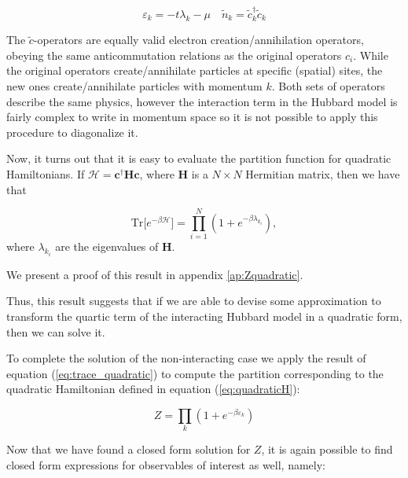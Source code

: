 \begin{equation}
\varepsilon_k = -t \lambda_k - \mu \quad \tilde{n}_k = \tilde{c}_k^\dagger \tilde{c}_k
\end{equation}

The $\tilde{c}$-operators are equally valid electron creation/annihilation operators, obeying the same anticommutation relations as the original operators $c_i$. While the original operators create/annihilate particles at specific (spatial) sites, the new ones create/annihilate particles with momentum $k$. Both sets of operators describe the same physics, however the interaction term in the Hubbard model is fairly complex to write in momentum space so it is not possible to apply this procedure to diagonalize it.

\bigskip

Now, it turns out that it is easy to evaluate the partition function for quadratic Hamiltonians. If $\mathcal{H} = \bm c^\dagger \bm H \bm c$, where $\bm H$ is a $N \times N$ Hermitian matrix, then we have that

\begin{equation}\label{eq:trace_quadratic}
\text{Tr} \big[ e^{-\beta \mathcal{H} } \big] = \prod_{i=1}^N ( 1 + e^{-\beta \lambda_{k_i} } ) ,
\end{equation}
where $\lambda_{k_i}$ are the eigenvalues of $\bm H$.

We present a proof of this result in appendix \ref{ap:Zquadratic}.

Thus, this result suggests that if we are able to devise some approximation to transform the quartic term of the interacting Hubbard model in a quadratic form, then we can solve it.

To complete the solution of the non-interacting case we apply the result of equation (\ref{eq:trace_quadratic}) to compute the partition corresponding to the quadratic Hamiltonian defined in equation (\ref{eq:quadraticH}):

\begin{equation}
Z = \prod_k ( 1 + e^{-\beta \varepsilon_k} )
\end{equation}

Now that we have found a closed form solution for $Z$, it is again possible to find closed form expressions for observables of interest as well, namely:

